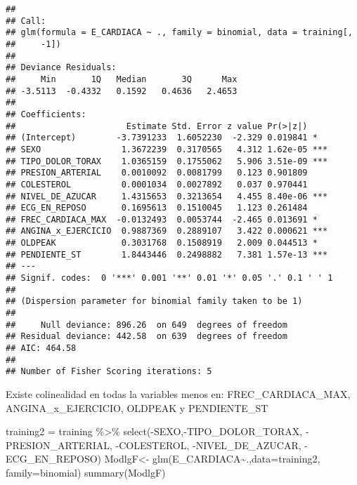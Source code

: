 \documentclass[
]{article}
\newenvironment{Shaded}{\begin{snugshade}}{\end{snugshade}}
\newcommand{\AttributeTok}[1]{\textcolor[rgb]{0.80,0.80,0.80}{#1}}
\newcommand{\FunctionTok}[1]{\textcolor[rgb]{0.94,0.94,0.56}{#1}}
\newcommand{\NormalTok}[1]{\textcolor[rgb]{0.80,0.80,0.80}{#1}}
\newcommand{\OtherTok}[1]{\textcolor[rgb]{0.94,0.94,0.56}{#1}}
\newcommand{\SpecialCharTok}[1]{\textcolor[rgb]{0.86,0.64,0.64}{#1}}
\begin{document}
\begin{verbatim}
## 
## Call:
## glm(formula = E_CARDIACA ~ ., family = binomial, data = training[, 
##     -1])
## 
## Deviance Residuals: 
##     Min       1Q   Median       3Q      Max  
## -3.5113  -0.4332   0.1592   0.4636   2.4653  
## 
## Coefficients:
##                      Estimate Std. Error z value Pr(>|z|)    
## (Intercept)        -3.7391233  1.6052230  -2.329 0.019841 *  
## SEXO                1.3672239  0.3170565   4.312 1.62e-05 ***
## TIPO_DOLOR_TORAX    1.0365159  0.1755062   5.906 3.51e-09 ***
## PRESION_ARTERIAL    0.0010092  0.0081799   0.123 0.901809    
## COLESTEROL          0.0001034  0.0027892   0.037 0.970441    
## NIVEL_DE_AZUCAR     1.4315653  0.3213654   4.455 8.40e-06 ***
## ECG_EN_REPOSO       0.1695613  0.1510045   1.123 0.261484    
## FREC_CARDIACA_MAX  -0.0132493  0.0053744  -2.465 0.013691 *  
## ANGINA_x_EJERCICIO  0.9887369  0.2889107   3.422 0.000621 ***
## OLDPEAK             0.3031768  0.1508919   2.009 0.044513 *  
## PENDIENTE_ST        1.8443446  0.2498882   7.381 1.57e-13 ***
## ---
## Signif. codes:  0 '***' 0.001 '**' 0.01 '*' 0.05 '.' 0.1 ' ' 1
## 
## (Dispersion parameter for binomial family taken to be 1)
## 
##     Null deviance: 896.26  on 649  degrees of freedom
## Residual deviance: 442.58  on 639  degrees of freedom
## AIC: 464.58
## 
## Number of Fisher Scoring iterations: 5
\end{verbatim}

Existe colinealidad en todas la variables menos en: FREC\_CARDIACA\_MAX,
ANGINA\_x\_EJERCICIO, OLDPEAK y PENDIENTE\_ST

\begin{Shaded}
\begin{Highlighting}[]
\NormalTok{training2 }\OtherTok{=}\NormalTok{ training }\SpecialCharTok{\%\textgreater{}\%}
\FunctionTok{select}\NormalTok{(}\SpecialCharTok{{-}}\NormalTok{SEXO,}\SpecialCharTok{{-}}\NormalTok{TIPO\_DOLOR\_TORAX, }\SpecialCharTok{{-}}\NormalTok{PRESION\_ARTERIAL, }\SpecialCharTok{{-}}\NormalTok{COLESTEROL, }\SpecialCharTok{{-}}\NormalTok{NIVEL\_DE\_AZUCAR, }\SpecialCharTok{{-}}\NormalTok{ECG\_EN\_REPOSO)}
\NormalTok{ModlgF}\OtherTok{\textless{}{-}} \FunctionTok{glm}\NormalTok{(E\_CARDIACA}\SpecialCharTok{\textasciitilde{}}\NormalTok{.,}\AttributeTok{data=}\NormalTok{training2, }\AttributeTok{family=}\NormalTok{binomial)}
\FunctionTok{summary}\NormalTok{(ModlgF)}
\end{Highlighting}
\end{Shaded}
\end{document}

